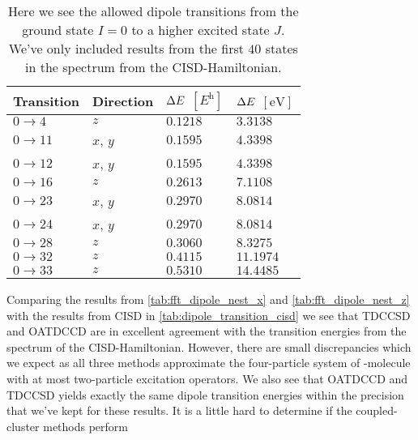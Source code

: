         \begin{table}
            \centering
            \caption{Here we see the allowed dipole transitions from the ground
            state $I = 0$ to a higher excited state $J$.
            We've only included results from the first $40$ states in the
            spectrum from the CISD-Hamiltonian.}
            \renewcommand{\arraystretch}{1.3}
            \begin{tabular}{@{}llll@{}}
                \toprule
                Transition & Direction
                &$\Delta E$ $[\si{\hartree}]$
                & $\Delta E$ $[\si{\electronvolt}]$ \\
                \midrule
                $0 \to 4$ & $z$ & $0.1218$ & $3.3138$ \\
                $0 \to 11$ & $x$, $y$ & $0.1595$ & $4.3398$ \\
                $0 \to 12$ & $x$, $y$ & $0.1595$ & $4.3398$ \\
                $0 \to 16$ & $z$ & $0.2613$ & $7.1108$ \\
                $0 \to 23$ & $x$, $y$ & $0.2970$ & $8.0814$ \\
                $0 \to 24$ & $x$, $y$ & $0.2970$ & $8.0814$ \\
                $0 \to 28$ & $z$ & $0.3060$ & $8.3275$ \\
                $0 \to 32$ & $z$ & $0.4115$ & $11.1974$ \\
                $0 \to 33$ & $z$ & $0.5310$ & $14.4485$ \\
                \bottomrule
            \end{tabular}
            \label{tab:dipole_transition_cisd}
        \end{table}
        Comparing the results from \autoref{tab:fft_dipole_nest_x} and
        \autoref{tab:fft_dipole_nest_z} with the results from CISD in
        \autoref{tab:dipole_transition_cisd} we see that TDCCSD and OATDCCD are
        in excellent agreement with the transition energies from the spectrum of
        the CISD-Hamiltonian.
        However, there are small discrepancies which we expect as all three
        methods approximate the four-particle system of -molecule with
        at most two-particle excitation operators.
        We also see that OATDCCD and TDCCSD yields exactly the same dipole
        transition energies within the precision that we've kept for these
        results.
        It is a little hard to determine if the coupled-cluster methods perform
